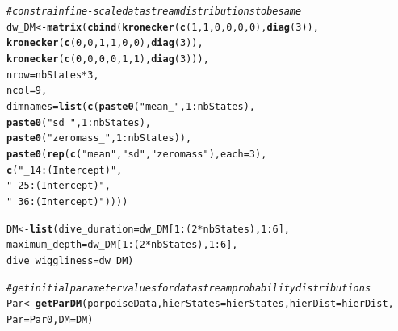 \documentclass[12pt]{article}\usepackage[]{graphicx}\usepackage[]{xcolor}
\makeatletter
\newcommand{\hlnum}[1]{\textcolor[rgb]{0.686,0.059,0.569}{#1}}%
\newcommand{\hlsng}[1]{\textcolor[rgb]{0.192,0.494,0.8}{#1}}%
\newcommand{\hlcom}[1]{\textcolor[rgb]{0.678,0.584,0.686}{\textit{#1}}}%
\newcommand{\hlopt}[1]{\textcolor[rgb]{0,0,0}{#1}}%
\newcommand{\hldef}[1]{\textcolor[rgb]{0.345,0.345,0.345}{#1}}%
\newcommand{\hlkwb}[1]{\textcolor[rgb]{0.69,0.353,0.396}{#1}}%
\newcommand{\hlkwc}[1]{\textcolor[rgb]{0.333,0.667,0.333}{#1}}%
\newcommand{\hlkwd}[1]{\textcolor[rgb]{0.737,0.353,0.396}{\textbf{#1}}}%
\newenvironment{kframe}{%
 \def\at@end@of@kframe{}%
 \ifinner\ifhmode%
  \def\at@end@of@kframe{\end{minipage}}%
  \begin{minipage}{\columnwidth}%
 \fi\fi%
 \def\FrameCommand##1{\hskip\@totalleftmargin \hskip-\fboxsep
 \colorbox{shadecolor}{##1}\hskip-\fboxsep
     \hskip-\linewidth \hskip-\@totalleftmargin \hskip\columnwidth}%
 \MakeFramed {\advance\hsize-\width
   \@totalleftmargin\z@ \linewidth\hsize
   \@setminipage}}%
 {\par\unskip\endMakeFramed%
 \at@end@of@kframe}
\newenvironment{knitrout}{}{} %
\makeatother
\begin{document}
\begin{knitrout}
\begin{kframe}
\begin{alltt}
\hlcom{# constrain fine-scale data stream distributions to be same}
\hldef{dw_DM} \hlkwb{<-} \hlkwd{matrix}\hldef{(}\hlkwd{cbind}\hldef{(}\hlkwd{kronecker}\hldef{(}\hlkwd{c}\hldef{(}\hlnum{1}\hldef{,}\hlnum{1}\hldef{,}\hlnum{0}\hldef{,}\hlnum{0}\hldef{,}\hlnum{0}\hldef{,}\hlnum{0}\hldef{),}\hlkwd{diag}\hldef{(}\hlnum{3}\hldef{)),}
                      \hlkwd{kronecker}\hldef{(}\hlkwd{c}\hldef{(}\hlnum{0}\hldef{,}\hlnum{0}\hldef{,}\hlnum{1}\hldef{,}\hlnum{1}\hldef{,}\hlnum{0}\hldef{,}\hlnum{0}\hldef{),}\hlkwd{diag}\hldef{(}\hlnum{3}\hldef{)),}
                      \hlkwd{kronecker}\hldef{(}\hlkwd{c}\hldef{(}\hlnum{0}\hldef{,}\hlnum{0}\hldef{,}\hlnum{0}\hldef{,}\hlnum{0}\hldef{,}\hlnum{1}\hldef{,}\hlnum{1}\hldef{),}\hlkwd{diag}\hldef{(}\hlnum{3}\hldef{))),}
                \hlkwc{nrow}\hldef{=nbStates}\hlopt{*}\hlnum{3}\hldef{,}
                \hlkwc{ncol}\hldef{=}\hlnum{9}\hldef{,}
                  \hlkwc{dimnames}\hldef{=}\hlkwd{list}\hldef{(}\hlkwd{c}\hldef{(}\hlkwd{paste0}\hldef{(}\hlsng{"mean_"}\hldef{,}\hlnum{1}\hlopt{:}\hldef{nbStates),}
                                  \hlkwd{paste0}\hldef{(}\hlsng{"sd_"}\hldef{,}\hlnum{1}\hlopt{:}\hldef{nbStates),}
                                  \hlkwd{paste0}\hldef{(}\hlsng{"zeromass_"}\hldef{,}\hlnum{1}\hlopt{:}\hldef{nbStates)),}
                                \hlkwd{paste0}\hldef{(}\hlkwd{rep}\hldef{(}\hlkwd{c}\hldef{(}\hlsng{"mean"}\hldef{,}\hlsng{"sd"}\hldef{,}\hlsng{"zeromass"}\hldef{),}\hlkwc{each}\hldef{=}\hlnum{3}\hldef{),}
                                       \hlkwd{c}\hldef{(}\hlsng{"_14:(Intercept)"}\hldef{,}
                                         \hlsng{"_25:(Intercept)"}\hldef{,}
                                         \hlsng{"_36:(Intercept)"}\hldef{))))}

\hldef{DM} \hlkwb{<-} \hlkwd{list}\hldef{(}\hlkwc{dive_duration}\hldef{=dw_DM[}\hlnum{1}\hlopt{:}\hldef{(}\hlnum{2}\hlopt{*}\hldef{nbStates),}\hlnum{1}\hlopt{:}\hlnum{6}\hldef{],}
           \hlkwc{maximum_depth}\hldef{=dw_DM[}\hlnum{1}\hlopt{:}\hldef{(}\hlnum{2}\hlopt{*}\hldef{nbStates),}\hlnum{1}\hlopt{:}\hlnum{6}\hldef{],}
           \hlkwc{dive_wiggliness}\hldef{=dw_DM)}

\hlcom{# get initial parameter values for data stream probability distributions}
\hldef{Par} \hlkwb{<-} \hlkwd{getParDM}\hldef{(porpoiseData,}\hlkwc{hierStates}\hldef{=hierStates,}\hlkwc{hierDist}\hldef{=hierDist,}
                \hlkwc{Par}\hldef{=Par0,}\hlkwc{DM}\hldef{=DM)}
\end{alltt}
\end{kframe}
\end{knitrout}
\end{document}
